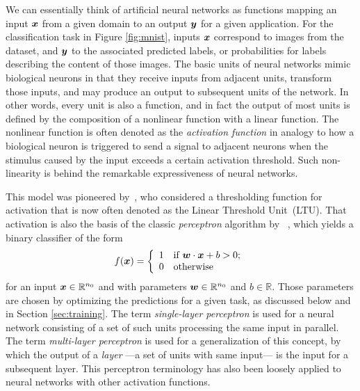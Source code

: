 We can essentially think of artificial neural networks as functions mapping an input ${\bm{x}}$ from a given domain to an output ${\bm{y}}$ for a given application. 
For the classification task in Figure \ref{fig:mnist}, inputs ${\bm{x}}$ correspond to images from the dataset, and ${\bm{y}}$ to the associated predicted labels, or probabilities for labels describing the content of those images. 
The basic units of neural networks mimic biological neurons in that they receive inputs from adjacent units, transform those inputs, and may produce an output to subsequent units of the network. 
In other words, every unit is also a function, and in fact %
the output of most units is defined by the composition of a nonlinear function with a linear function. 
The nonlinear function is often denoted as the \emph{activation function} in analogy to how a biological neuron is triggered to send a signal to adjacent neurons when the stimulus caused by the input exceeds a certain activation threshold. Such non-linearity is behind the remarkable expressiveness of neural networks.

This model was pioneered by~\cite{FirstANN}, who considered a thresholding function for activation that is now often denoted as the Linear Threshold Unit~(LTU). 
That activation is also the basis of the classic \emph{perceptron} algorithm by ~\cite{perceptron}, 
which yields a binary classifier of the form 
\begin{equation}
f({\bm{x}}) = \left\{ \begin{array}{cl} 1 & \text{if } {\bm{w}} \cdot {\bm{x}} + b > 0; \\ 0 & \text{otherwise} \end{array} \right. 
\end{equation}
for an input ${\bm{x}} \in \mathbb{R}^{n_0}$ and with parameters ${\bm{w}} \in\mathbb{R}^{n_0}$ and $b \in \mathbb{R}$. Those parameters are chosen by optimizing the predictions for a given task, as discussed below and in Section \ref{sec:training}. The term \emph{single-layer perceptron} is used for a neural network consisting of a set of such units processing the same input in parallel. 
The term \emph{multi-layer perceptron} is used for a generalization of this concept, by which the output of a \emph{layer} ---a set of units with same input--- is the input for a subsequent layer. This perceptron terminology has also been loosely applied to neural networks with other activation functions.

